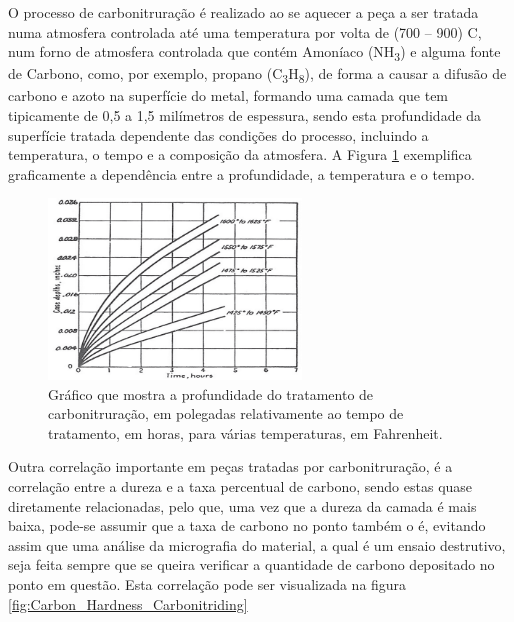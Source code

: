 \par
O processo de carbonitruração é realizado ao se aquecer a peça a ser tratada numa atmosfera controlada até uma temperatura por volta de (700 – 900) \textdegree C, num forno de atmosfera controlada que contém Amoníaco (NH\textsubscript{3}) e alguma fonte de Carbono, como, por exemplo, propano (C\textsubscript{3}H\textsubscript{8}), de forma a causar a difusão de carbono e azoto na superfície do metal, formando uma camada que tem tipicamente de 0,5 a 1,5 milímetros de espessura\cite{Rajan2011}, sendo esta profundidade da superfície tratada dependente das condições do processo, incluindo a temperatura, o tempo e a composição da atmosfera. A Figura \ref{fig:Carbonitriding_depth} exemplifica graficamente a dependência entre a profundidade, a temperatura e o tempo.
\begin{figure}[htb]
    \centering
    \includegraphics[width = 0.6\textwidth]{Figures/Cap2/Carbonitriding_depth.png}
    \caption[Composição de carbono e azoto em relação à profundidade de tratamento]%
    {Gráfico que mostra a profundidade do tratamento de carbonitruração, em polegadas relativamente ao tempo de tratamento, em horas, para várias temperaturas, em Fahrenheit.\cite{Herring2011}}
    \label{fig:Carbonitriding_depth}
\end{figure}%
\newpage
\par
Outra correlação importante em peças tratadas por carbonitruração, é a correlação entre a dureza e a taxa percentual de carbono, sendo estas quase diretamente relacionadas, pelo que, uma vez que a dureza da camada é mais baixa, pode-se assumir que a taxa de carbono no ponto também o é, evitando assim que uma análise da micrografia do material, a qual é um ensaio destrutivo, seja feita sempre que se queira verificar a quantidade de carbono depositado no ponto em questão. Esta correlação pode ser visualizada na figura \ref{fig:Carbon_Hardness_Carbonitriding}
